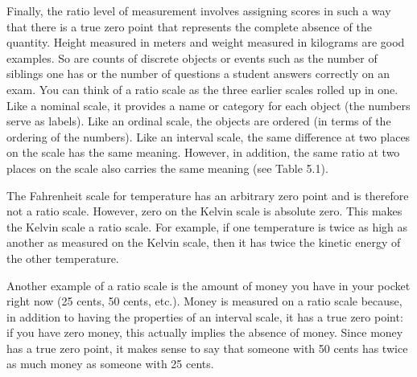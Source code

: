 Finally, the ratio level of measurement involves assigning scores in such a way that there is a true zero point that represents the complete absence of the quantity. Height measured in meters and weight measured in kilograms are good examples. So are counts of discrete objects or events such as the number of siblings one has or the number of questions a student answers correctly on an exam. You can think of a ratio scale as the three earlier scales rolled up in one. Like a nominal scale, it provides a name or category for each object (the numbers serve as labels). Like an ordinal scale, the objects are ordered (in terms of the ordering of the numbers). Like an interval scale, the same difference at two places on the scale has the same meaning. However, in addition, the same ratio at two places on the scale also carries the same meaning (see Table 5.1).

The Fahrenheit scale for temperature has an arbitrary zero point and is therefore not a ratio scale. However, zero on the Kelvin scale is absolute zero. This makes the Kelvin scale a ratio scale. For example, if one temperature is twice as high as another as measured on the Kelvin scale, then it has twice the kinetic energy of the other temperature.

Another example of a ratio scale is the amount of money you have in your pocket right now (25 cents, 50 cents, etc.). Money is measured on a ratio scale because, in addition to having the properties of an interval scale, it has a true zero point: if you have zero money, this actually implies the absence of money. Since money has a true zero point, it makes sense to say that someone with 50 cents has twice as much money as someone with 25 cents.

